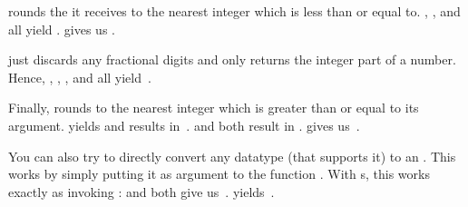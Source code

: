  rounds the  it receives to the nearest integer which is less than or equal to.
, , and  all yield .
 gives us .

 just discards any fractional digits and only returns the integer part of a number.
Hence, , , , and  all yield~.

Finally,  rounds to the nearest integer which is greater than or equal to its argument.
 yields  and  results in~.
 and  both result in .
 gives us~.

You can also try to directly convert any datatype (that supports it) to an .
This works by simply putting it as argument to the function .
With s, this works exactly as invoking :
 and  both give us~.
 yields~.

